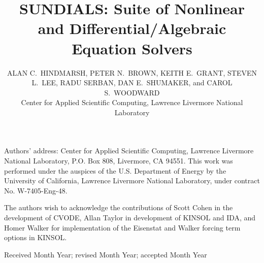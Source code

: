 \documentclass[acmtoms]{acmtrans2m}
\title{SUNDIALS: Suite of Nonlinear and Differential/Algebraic Equation Solvers}
\author{ALAN C.~HINDMARSH, PETER N.~BROWN, KEITH E.~GRANT,  
  STEVEN L.~LEE, RADU SERBAN, DAN E.~SHUMAKER, and CAROL S.~WOODWARD \\
  Center for Applied Scientific Computing,
  Lawrence Livermore National Laboratory}
\begin{document}
\setcounter{page}{1}

\begin{bottomstuff}
Authors' address: Center for Applied Scientific Computing, 
Lawrence Livermore National Laboratory, P.O. Box 808,
Livermore, CA 94551.\newline
This work was performed under the auspices of the
U.S. Department of Energy by the University of California,
Lawrence Livermore National Laboratory, under contract No.
W-7405-Eng-48.
\end{bottomstuff}

\maketitle




   
   
   








\begin{acks}
The authors wish to acknowledge the contributions of Scott Cohen
in the development of CVODE, Allan Taylor in development of
KINSOL and IDA, and Homer Walker for implementation of the
Eisenstat and Walker forcing term options in KINSOL.

\end{acks}





\begin{received}
Received Month Year;
revised Month Year; accepted Month Year
\end{received}
\end{document}
